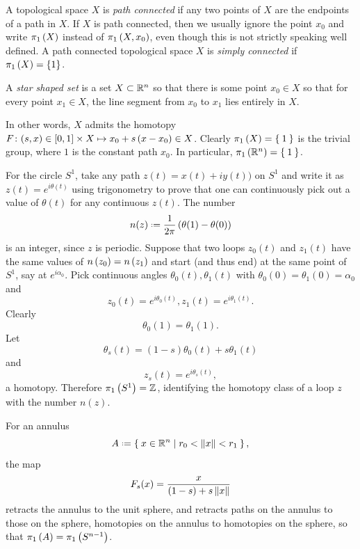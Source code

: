 A topological space \(X\) is \emph{path connected}%
%
if any two points of \(X\) are the endpoints of a path in \(X\).
If \(X\) is path connected, then we usually ignore the point \(x_0\) and write \(\pi_{1}\left(X\right)\) instead of \(\pi_{1}\left(X,x_0\right)\), even though this is not strictly speaking well defined.
A path connected topological space \(X\) is \emph{simply connected} if \(\pi_{1}\left(X\right)=\left\{1\right\}\).
\begin{example}
A \emph{star shaped set} is a set \(X \subset \mathbb{R}^{n}\) so that there is some point \(x_0 \in X\) so that for every point \(x_1 \in X\), the line segment from \(x_0\) to \(x_1\) lies entirely in \(X\).
\begin{center}

\end{center}
In other words, \(X\) admits the homotopy \(F \colon (s,x) \in [0,1] \times X \mapsto x_0+s\left(x-x_0\right) \in X\).
Clearly \(\pi_{1}\left(X\right)=\Set{1}\) is the trivial group, where \(1\) is the constant path \(x_0\).
In particular, \(\pi_{1}\left(\mathbb{R}^{n}\right)=\Set{1}\).
\end{example}
\begin{example}
For the circle \(S^1\), take any path \(z(t)=x(t)+iy(t))\) on \(S^1\) and write it as \(z(t)=e^{i\theta(t)}\) using trigonometry to prove that one can continuously pick out a value of \(\theta(t)\) for any continuous \(z(t)\).
The number 
\[
n(z) \defeq \frac{1}{2\pi} \pr{\theta(1)-\theta(0)}
\]
is an integer, since \(z\) is periodic.
Suppose that two loops \(z_0(t)\) and \(z_1(t)\) have the same values of \(n\left(z_0\right)=n\left(z_1\right)\) and start (and thus end) at the same point of \(S^1\), say at \(e^{i \alpha_0}\).
Pick continuous angles \(\theta_0(t), \theta_1(t)\) with \(\theta_0(0)=\theta_1(0)=\alpha_0\) and 
\[
z_0(t)=e^{i\theta_0(t)}, z_1(t)=e^{i \theta_1(t)}.
\]
Clearly 
\[
\theta_0(1)=\theta_1(1).
\]
Let
\[
\theta_s(t) = (1-s)\theta_0(t)+s\theta_1(t)
\]
and 
\[
z_s(t) = e^{i\theta_s(t)},
\]
a homotopy.
Therefore \(\pi_{1}\left(S^1\right)=\mathbb{Z}^{}\), identifying the homotopy class of a loop \(z\) with the number \(n(z)\).
\end{example}
\begin{example}
For an annulus 
\[
A\defeq\Set{x \in \R{n}|r_0 < \norm{x} < r_1},
\]
the map 
\[
F_s(x)=\frac{x}{(1-s)+s\left\|x\right\|}
\]
retracts the annulus to the unit sphere, and retracts paths on the annulus to those on the sphere, homotopies on the annulus to homotopies on the sphere, so that \(\pi_{1}\left(A\right)=\pi_{1}\left(S^{n-1}\right)\).
\end{example}

